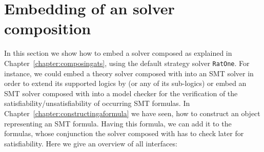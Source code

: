 \chapter{Embedding of an \smtrat solver composition}
\label{chapter:embedding}
In this section we show how to embed a solver composed as explained
in Chapter~\ref{chapter:composingats}, \eg using the default strategy
solver \texttt{RatOne}. For instance, we could embed a theory solver composed with \smtrat 
into an SMT solver in order to extend its supported logics by \supportedLogics (or any of its sub-logics) 
or embed an SMT solver composed with \smtrat into a model checker for the verification of the 
satisfiability/unsatisfiability of occurring SMT formulas. In Chapter~\ref{chapter:constructingaformula}
we have seen, how to construct an object representing an SMT formula. Having this formula,
we can add it to the formulas, whose conjunction the solver composed with \smtrat has to check later
for satisfiability. Here we give an overview of all interfaces:

